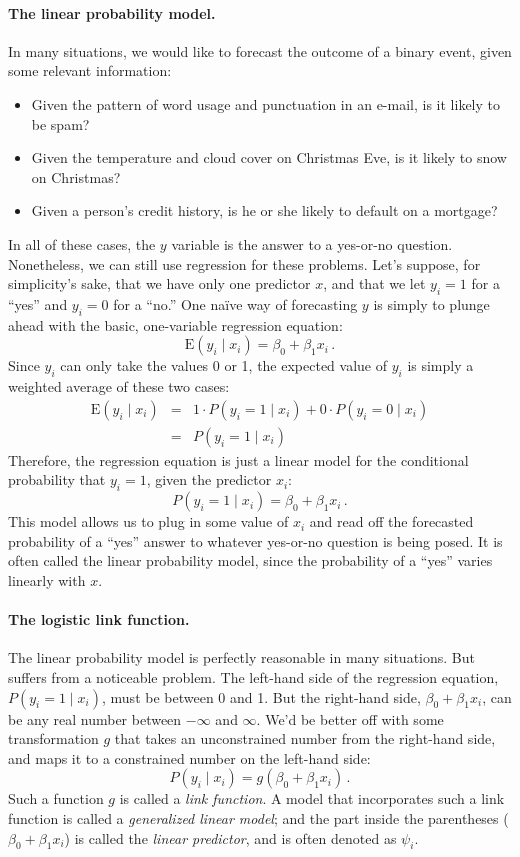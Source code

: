 \documentclass[11pt]{article}
\newcommand{\E}{\mbox{E}}
\newcommand{\1}[1]{\mathbf{1}_{\{ {#1} \}}}
\begin{document}
\paragraph{The linear probability model.} In many situations, we would like to forecast the outcome of a binary event, given some relevant information:
\begin{itemize}
\item Given the pattern of word usage and punctuation in an e-mail, is it likely to be spam?
\item Given the temperature and cloud cover on Christmas Eve, is it likely to snow on Christmas?
\item Given a person's credit history, is he or she likely to default on a mortgage?
\end{itemize}

In all of these cases, the $y$ variable is the answer to a yes-or-no question.  Nonetheless, we can still use regression for these problems.  Let's suppose, for simplicity's sake, that we have only one predictor $x$, and that we let $y_i = 1$ for a ``yes'' and $y_i = 0$ for a ``no.''  One na\"ive way of forecasting $y$ is simply to plunge ahead with the basic, one-variable regression equation:
$$
\E(y_i \mid x_i) = \beta_0 + \beta_1 x_i \, .
$$
Since $y_i$ can only take the values 0 or 1, the expected value of $y_i$ is simply a weighted average of these two cases: 
\begin{eqnarray*}
\E(y_i \mid x_i) &=& 1 \cdot P(y_i = 1 \mid x_i) + 0 \cdot P(y_i = 0 \mid x_i) \\
&=& P(y_i =1 \mid x_i) 
\end{eqnarray*}
Therefore, the regression equation is just a linear model for the conditional probability that $y_i = 1$, given the predictor $x_i$:
$$
P(y_i =1 \mid x_i) = \beta_0 + \beta_1 x_i \, .
$$
This model allows us to plug in some value of $x_i$ and read off the forecasted probability of a ``yes'' answer to whatever yes-or-no question is being posed.  It is often called the linear probability model, since the probability of a ``yes'' varies linearly with $x$.


\paragraph{The logistic link function.}

The linear probability model is perfectly reasonable in many situations.  But suffers from a noticeable problem.  The left-hand side of the regression equation, $P(y_i = 1 \mid x_i)$, must be between 0 and 1.  But the right-hand side, $\beta_0 + \beta_1 x_i$, can be any real number between $-\infty$ and $\infty$.  We'd be better off with some transformation $g$ that takes an unconstrained number from the right-hand side, and maps it to a constrained number on the left-hand side:
$$
P(y_i \mid x_i) = g(\beta_0 + \beta_1 x_i) \, .
$$
Such a function $g$ is called a \textit{link function}.  A model that incorporates such a link function is called a \textit{generalized linear model}; and the part inside the parentheses ($\beta_0 + \beta_1 x_i$) is called the \textit{linear predictor}, and is often denoted as $\psi_i$.
\end{document}

